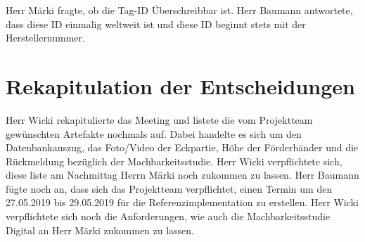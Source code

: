 \documentclass[parskip=full, a4paper]{scrreprt}
\begin{document}
Herr Märki fragte, ob die Tag-ID Überschreibbar ist. Herr Baumann antwortete, dass diese ID einmalig weltweit ist und diese ID beginnt stets mit der Herstellernummer.

\chapter{Rekapitulation der Entscheidungen}
Herr Wicki rekapitulierte das Meeting und listete die vom Projektteam gewünschten Artefakte nochmals auf. Dabei handelte es sich um den Datenbankauszug, das Foto/Video der Eckpartie, Höhe der Förderbänder und die Rückmeldung bezüglich der Machbarkeitsstudie. Herr Wicki verpflichtete sich, diese liste am Nachmittag Herrn Märki noch zukommen zu lassen. Herr Baumann fügte noch an, dass sich das Projektteam verpflichtet, einen Termin um den 27.05.2019 bis 29.05.2019 für die Referenzimplementation zu erstellen.  Herr Wicki verpflichtete sich noch die Anforderungen, wie auch die Machbarkeitsstudie Digital an Herr Märki zukommen zu lassen.
\end{document}
